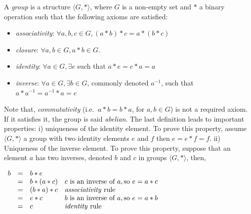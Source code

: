 \begin{definition}[Group]
 A \emph{group} is a structure $\langle G, * \rangle$, where $G$ is a non-empty set and $*$ a binary
 operation such that the following axioms are satisfied:
 \begin{itemize}[noitemsep,nolistsep]
  \item \emph{associativity}: $\forall a, b, c \in G, (a * b) * c = a * (b * c)$
  \item \emph{closure}: $\forall a, b \in G, a * b \in G$.
  \item \emph{identity}: $\forall a \in G, \exists e$ such that $ a * e = e * a = a$
  \item \emph{inverse}:  $\forall a \in G, \exists b \in G$, commonly denoted $a^{-1}$, such that
  $a * a^{-1} = a^{-1} * a = e$
 \end{itemize}
\end{definition}
Note that, \emph{commutativity} (i.e. $\ a * b = b * a$, for $a, b \in G$) is not a required axiom.
If it satisfies it, the group is said \emph{abelian}.
The last definition leads to important properties: i) uniqueness of the identity element. 
To prove this property, assume $\langle G, * \rangle$ a group with two identity elements $e$ and $f$ 
then $ e = e * f = f$.
ii) Uniqueness of the inverse element. To prove this property, suppose that an element $a$ has two inverses,
denoted $b$ and $c$ in groups $\langle G, * \rangle$, then,

 $\begin{array}{lcll}     
b & = & b * e & \\
& = & b * (a * c) & c \text{ is an inverse of } a, \text{so } e = a * c\\
& = & (b * a) * c &   \text{\emph{associativity} rule}\\
& = & e * c       & b \text{ is an inverse of } a, \text{so } e = a * b\\
& = & c           &   \text{\emph{identity} rule}
\end{array}$


